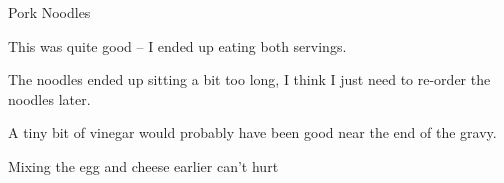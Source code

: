\documentclass{recipe}
\begin{document}
\begin{recipe}{Pork Noodles}
  \begin{notes}
  \item This was quite good -- I ended up eating both servings.
  \item The noodles ended up sitting a bit too long, I think I just
    need to re-order the noodles later.
  \item A tiny bit of vinegar would probably have been good near the
    end of the gravy.
  \item Mixing the egg and cheese earlier can't hurt
  \end{notes}
\end{recipe}
\end{document}
